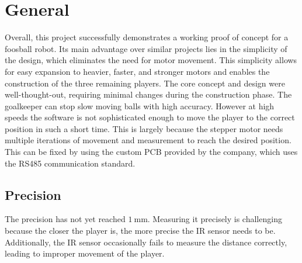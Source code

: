 \section{General}\label{sec:general4}
Overall, this project successfully demonstrates a working proof of concept for a foosball robot.
Its main advantage over similar projects lies in the simplicity of the design, which eliminates the need for motor movement.
This simplicity allows for easy expansion to heavier, faster, and stronger motors and enables the construction of the three remaining players.
The core concept and design were well-thought-out, requiring minimal changes during the construction phase.
The goalkeeper can stop slow moving balls with high accuracy.
However at high speeds the software is not sophisticated enough to move the player to the correct position in such a short time.
This is largely because the stepper motor needs multiple iterations of movement and measurement to reach the desired position.
This can be fixed by using the custom PCB provided by the company, which uses the RS485 communication standard.


\subsection{Precision}\label{subsec:precision}
The precision has not yet reached $\qty[per-mode=symbol]{1}{\mm}$.
Measuring it precisely is challenging because the closer the player is, the more precise the IR sensor needs to be.
Additionally, the IR sensor occasionally fails to measure the distance correctly, leading to improper movement of the player.

